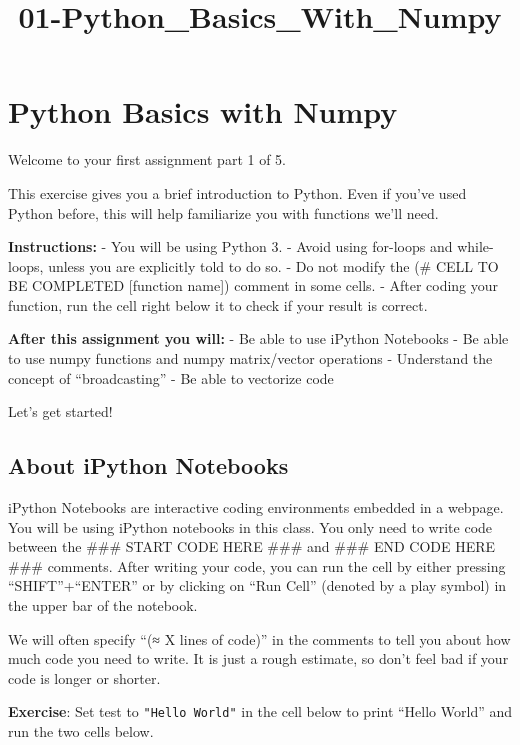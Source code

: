 \documentclass[11pt]{article}
\title{01-Python\_Basics\_With\_Numpy}
\begin{document}
    
    \maketitle
    
    

    
    \hypertarget{python-basics-with-numpy}{%
\section{Python Basics with Numpy}\label{python-basics-with-numpy}}

Welcome to your first assignment part 1 of 5.

This exercise gives you a brief introduction to Python. Even if you've
used Python before, this will help familiarize you with functions we'll
need.

\textbf{Instructions:} - You will be using Python 3. - Avoid using
for-loops and while-loops, unless you are explicitly told to do so. - Do
not modify the (\# CELL TO BE COMPLETED {[}function name{]}) comment in
some cells. - After coding your function, run the cell right below it to
check if your result is correct.

\textbf{After this assignment you will:} - Be able to use iPython
Notebooks - Be able to use numpy functions and numpy matrix/vector
operations - Understand the concept of ``broadcasting'' - Be able to
vectorize code

Let's get started!

    \hypertarget{about-ipython-notebooks}{%
\subsection{About iPython Notebooks}\label{about-ipython-notebooks}}

iPython Notebooks are interactive coding environments embedded in a
webpage. You will be using iPython notebooks in this class. You only
need to write code between the \#\#\# START CODE HERE \#\#\# and \#\#\#
END CODE HERE \#\#\# comments. After writing your code, you can run the
cell by either pressing ``SHIFT''+``ENTER'' or by clicking on ``Run
Cell'' (denoted by a play symbol) in the upper bar of the notebook.

We will often specify ``(≈ X lines of code)'' in the comments to tell
you about how much code you need to write. It is just a rough estimate,
so don't feel bad if your code is longer or shorter.

\textbf{Exercise}: Set test to \texttt{"Hello\ World"} in the cell below
to print ``Hello World'' and run the two cells below.
\end{document}
